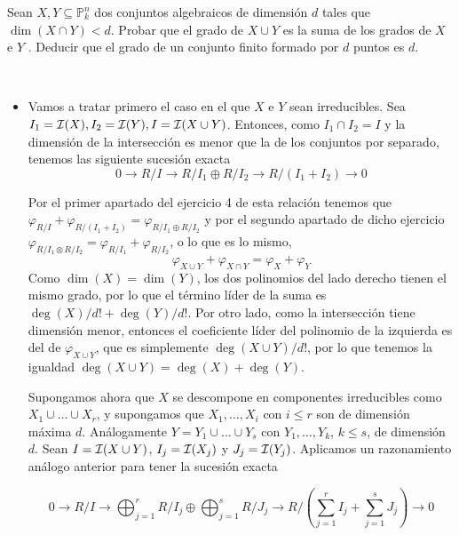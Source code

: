 \documentclass[twoside]{article}
\begin{document}
\newpage

\begin{ejercicio}{2}
 
Sean $X, Y ⊆ \mathbb{P}^n_k$
dos conjuntos algebraicos de dimensión $d$ tales
que $\dim(X ∩Y ) < d$. Probar que el grado de $X ∪Y$ es la suma de los grados de
$X$ e $Y$ . Deducir que el grado de un conjunto finito formado por $d$ puntos es $d$.
\end{ejercicio}

\begin{solucion}\
\begin{itemize}
\item Vamos a tratar primero el caso en el que $X$ e $Y$ sean irreducibles. Sea $I_1=\mathcal{I}(X),  I_2=\mathcal{I}(Y), I=\mathcal{I}(X\cup Y)$. Entonces, como $I_1\cap I_2=I$ y la dimensión de la intersección es menor que la de los conjuntos por separado, tenemos las siguiente sucesión exacta
\[
0\to R/I\to R/I_1\oplus R/I_2\to R/(I_1+I_2)\to 0
\]

Por el primer apartado del ejercicio 4 de esta relación tenemos que $\varphi_{R/I}+\varphi_{R/(I_1+I_2)}=\varphi_{R/I_1\oplus R/I_2}$ y por el segundo apartado de dicho ejercicio $\varphi_{R/I_1\otimes R/I_2}=\varphi_{R/I_1} + \varphi_{R/I_2}$, o lo que es lo mismo,
\[
\varphi_{X\cup Y}+\varphi_{X\cap Y}=\varphi_{X} + \varphi_{Y}
\]
Como $\dim(X)=\dim(Y)$, los dos polinomios del lado derecho tienen el mismo grado, por lo que el término líder de la suma es $\deg(X)/d!+\deg(Y)/d!$. Por otro lado, como la intersección tiene dimensión menor, entonces el coeficiente líder del polinomio de la izquierda es del de $\varphi_{X\cup Y}$, que es simplemente $\deg(X\cup Y)/d!$, por lo que tenemos la igualdad $\deg(X\cup Y)=\deg(X)+\deg(Y)$.


Supongamos ahora que $X$ se descompone en componentes irreducibles como $X_1\cup\dots\cup X_r$, y supongamos que $X_1,\dots, X_i$ con $i\leq r$ son de dimensión máxima $d$. Análogamente $Y=Y_1\cup\dots\cup Y_s$ con $Y_1,\dots, Y_k$, $k\leq s$, de dimensión $d$. Sean $I=\mathcal{I}(X\cup Y)$, $I_j=\mathcal{I}(X_j)$ y $J_j=\mathcal{I}(Y_j)$. Aplicamos un razonamiento análogo anterior para tener la sucesión exacta 

\[
0\to R/I\to \bigoplus_{j=1}^r R/I_j \oplus \bigoplus_{j=1}^s R/J_j\to R/(\sum_{j=1}^r I_j+\sum_{j=1}^s J_j)\to 0
\]


\end{itemize}
\end{solucion}
\end{document}
